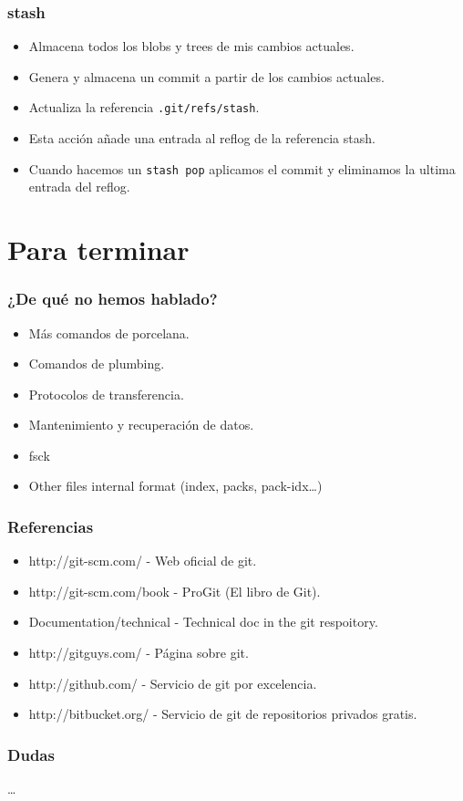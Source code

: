 \documentclass[10pt]{beamer}
\begin{document}
  \begin{frame}[containsverbatim]
    \frametitle{stash}
    \begin{itemize}
      \item Almacena todos los blobs y trees de mis cambios actuales.
      \item Genera y almacena un commit a partir de los cambios actuales.
      \item Actualiza la referencia \verb+.git/refs/stash+.
      \item Esta acción añade una entrada al reflog de la referencia stash.
      \item Cuando hacemos un \verb+stash pop+ aplicamos el commit y eliminamos la ultima entrada del reflog.
    \end{itemize}
  \end{frame}

  \section*{Para terminar}

  \begin{frame}[containsverbatim]
    \frametitle{¿De qué no hemos hablado?}
    \begin{itemize}
        \item Más comandos de porcelana.
        \item Comandos de plumbing.
        \item Protocolos de transferencia.
        \item Mantenimiento y recuperación de datos.
        \item fsck
        \item Other files internal format (index, packs, pack-idx\dots{})
    \end{itemize}
  \end{frame}

  \begin{frame}[containsverbatim]
    \frametitle{Referencias}
    \begin{itemize}
      \item \small{http://git-scm.com/ - Web oficial de git.}
      \item \small{http://git-scm.com/book - ProGit (El libro de Git).}
      \item \small{Documentation/technical - Technical doc in the git respoitory. }
      \item \small{http://gitguys.com/ - Página sobre git.}
      \item \small{http://github.com/ - Servicio de git por excelencia.}
      \item \small{http://bitbucket.org/ - Servicio de git de repositorios privados gratis.}
    \end{itemize}
  \end{frame}

  \begin{frame}[containsverbatim]
    \frametitle{Dudas}
    \dots
  \end{frame}
\end{document}
